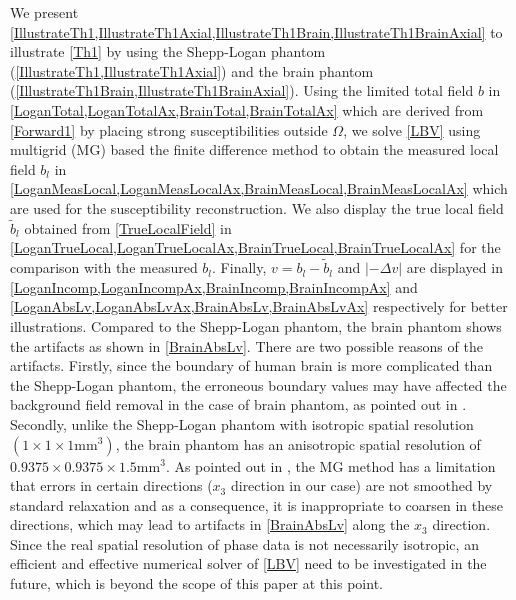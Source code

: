 \documentclass[reqno]{siamonline1116}
\numberwithin{theorem}{section}
\numberwithin{equation}{section}
\def\Om{\Omega}
\def\wt{\widetilde}
\begin{document}
We present \cref{IllustrateTh1,IllustrateTh1Axial,IllustrateTh1Brain,IllustrateTh1BrainAxial} to illustrate \cref{Th1} by using the Shepp-Logan phantom (\cref{IllustrateTh1,IllustrateTh1Axial}) and the brain phantom (\cref{IllustrateTh1Brain,IllustrateTh1BrainAxial}). Using the limited total field $b$ in \cref{LoganTotal,LoganTotalAx,BrainTotal,BrainTotalAx} which are derived from \cref{Forward1} by placing strong susceptibilities outside $\Om$, we solve \cref{LBV} using multigrid (MG) based the finite difference method \cite{D.Zhou2014} to obtain the measured local field $b_l$ in \cref{LoganMeasLocal,LoganMeasLocalAx,BrainMeasLocal,BrainMeasLocalAx} which are used for the susceptibility reconstruction. We also display the true local field $\wt{b}_l$ obtained from \cref{TrueLocalField} in \cref{LoganTrueLocal,LoganTrueLocalAx,BrainTrueLocal,BrainTrueLocalAx} for the comparison with the measured $b_l$. Finally, $v=b_l-\wt{b}_l$ and $|-\Delta v|$ are displayed in \cref{LoganIncomp,LoganIncompAx,BrainIncomp,BrainIncompAx} and \cref{LoganAbsLv,LoganAbsLvAx,BrainAbsLv,BrainAbsLvAx} respectively for better illustrations. Compared to the Shepp-Logan phantom, the brain phantom shows the artifacts as shown in \cref{BrainAbsLv}. There are two possible reasons of the artifacts. Firstly, since the boundary of human brain is more complicated than the Shepp-Logan phantom, the erroneous boundary values may have affected the background field removal in the case of brain phantom, as pointed out in \cite{D.Zhou2014}. Secondly, unlike the Shepp-Logan phantom with isotropic spatial resolution $(1\times1\times1\mathrm{mm}^3)$, the brain phantom has an anisotropic spatial resolution of $0.9375\times0.9375\times1.5\mathrm{mm}^3$. As pointed out in \cite{M.W.Gee2009}, the MG method has a limitation that errors in certain directions ($x_3$ direction in our case) are not smoothed by standard relaxation and as a consequence, it is inappropriate to coarsen in these directions, which may lead to artifacts in \cref{BrainAbsLv} along the $x_3$ direction. Since the real spatial resolution of phase data is not necessarily isotropic, an efficient and effective numerical solver of \cref{LBV} need to be investigated in the future, which is beyond the scope of this paper at this point.

\end{document}
